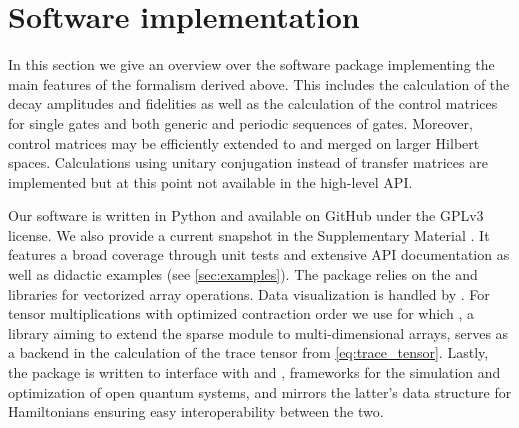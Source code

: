 \section{Software implementation}\label{sec:software}
In this section we give an overview over the \filterfunctions software package implementing the main features of the formalism derived above. This includes the calculation of the decay amplitudes \decayamps and fidelities as well as the calculation of the control matrices for single gates and both generic and periodic sequences of gates. Moreover, control matrices may be efficiently extended to and merged on larger Hilbert spaces. Calculations using unitary conjugation instead of transfer matrices are implemented but at this point not available in the high-level API.

Our software is written in Python and available on GitHub \cite{software} under the GPLv3 license. We also provide a current snapshot in the Supplementary Material \cite{prrSupp}. It features a broad coverage through unit tests and extensive API documentation as well as didactic examples (see \cref{sec:examples}). The package relies on the \numpy \cite{Harris2020} and \scipy \cite{Virtanen2020} libraries for vectorized array operations. Data visualization is handled by \matplotlib \cite{Hunter2007}. For tensor multiplications with optimized contraction order we use \opteinsum \cite{Smith2018} for which \sparse \cite{sparse}, a library aiming to extend the \scipy sparse module to multi-dimensional arrays, serves as a backend in the calculation of the trace tensor from \cref{eq:trace_tensor}. Lastly, the package is written to interface with \qopt \cite{qopt,Teske2021} and \qutip \cite{Johansson2013}, frameworks for the simulation and optimization of open quantum systems, and mirrors the latter's data structure for Hamiltonians ensuring easy interoperability between the two.

